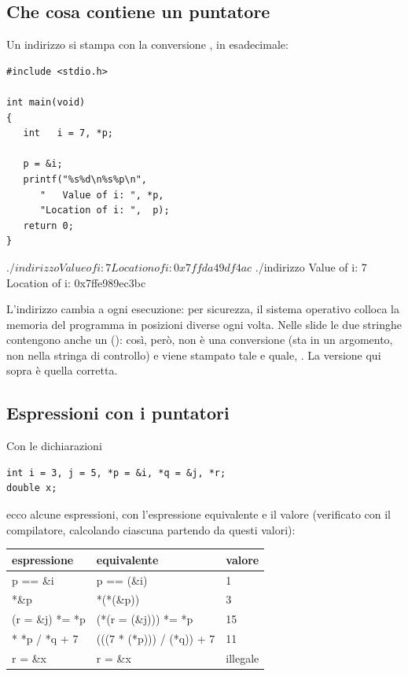 \subsection{Che cosa contiene un puntatore}

Un indirizzo si stampa con la conversione , in esadecimale:

\begin{affianco}[0.5][c]
\begin{lstlisting}[style=c, name=indirizzo.c]
#include <stdio.h>

int main(void)
{
   int   i = 7, *p;

   p = &i;
   printf("%s%d\n%s%p\n",
      "   Value of i: ", *p,
      "Location of i: ",  p);
   return 0;
}
\end{lstlisting}
\risultato
\begin{console}
$ ./indirizzo
   Value of i: 7
Location of i: 0x7ffda49df4ac
$ ./indirizzo
   Value of i: 7
Location of i: 0x7ffe989ec3bc
\end{console}
\end{affianco}

L'indirizzo cambia a ogni esecuzione: per sicurezza, il sistema operativo
colloca la memoria del programma in posizioni diverse ogni volta. Nelle
slide le due stringhe contengono anche un 
(): così, però,  non è una conversione
(sta in un argomento, non nella stringa di controllo) e viene stampato tale
e quale, . La versione qui sopra è quella corretta.

\subsection{Espressioni con i puntatori}

Con le dichiarazioni

\begin{lstlisting}[style=c]
int i = 3, j = 5, *p = &i, *q = &j, *r;
double x;
\end{lstlisting}

ecco alcune espressioni, con l'espressione equivalente e il valore
(verificato con il compilatore, calcolando ciascuna partendo da questi
valori):

\begin{center}
\renewcommand{\arraystretch}{1.15}
\begin{tabular}{@{}>{\FiraCodeNL}l>{\FiraCodeNL}l l@{}}
  \toprule
  \normalfont\textbf{espressione} & \normalfont\textbf{equivalente} & \textbf{valore} \\
  \midrule
  p == \&i            & p == (\&i)                     & 1 \\
  **\&p               & *(*(\&p))                      & 3 \\
  *(r = \&j) *= *p    & (*(r = (\&j))) *= *p           & 15 \\
  7 * *p / *q + 7     & (((7 * (*p))) / (*q)) + 7      & 11 \\
  r = \&x             & r = \&x                        & illegale \\
  \bottomrule
\end{tabular}
\end{center}

